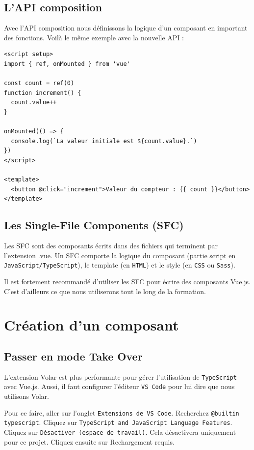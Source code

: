 \subsection{L'API composition}
Avec l'API composition nous définissons la logique d'un composant en important des fonctions. Voilà le même exemple avec la nouvelle API :
\begin{verbatim}
<script setup>
import { ref, onMounted } from 'vue'

const count = ref(0)
function increment() {
  count.value++
}

onMounted(() => {
  console.log(`La valeur initiale est ${count.value}.`)
})
</script>

<template>
  <button @click="increment">Valeur du compteur : {{ count }}</button>
</template>
\end{verbatim} 

\subsection{Les {\color{monOrange}Single-File Components} (SFC)}
Les SFC sont des composants écrits dans des fichiers qui terminent par l'extension {\color{monOrange}.vue}. Un SFC comporte la logique du composant (partie script en {\tt JavaScript/TypeScript}), le template (en {\tt HTML}) et le style (en {\tt CSS} ou {\tt Sass}).

Il est fortement recommandé d'utiliser les SFC pour écrire des composants {\color{monOrange}Vue.js}. C'est d'ailleurs ce que nous utiliserons tout le long de la formation.


\section{Création d'un composant}
\subsection{Passer en mode {\color{monOrange}Take Over}}
L'extension {\color{monOrange}Volar} est plus performante pour gérer l'utilisation de {\tt TypeScript} avec {\color{monOrange}Vue.js}. Aussi, il faut configurer l'éditeur {\tt VS Code} pour lui dire que nous utilisons {\color{monOrange}Volar}.

Pour ce faire, aller sur l'onglet {\tt Extensions de VS Code}. Recherchez {\tt @builtin typescript}. Cliquez sur {\tt TypeScript and JavaScript Language Features}. Cliquez sur {\tt Désactiver (espace de travail)}. Cela désactivera uniquement pour ce projet. Cliquez ensuite sur Rechargement requis.

